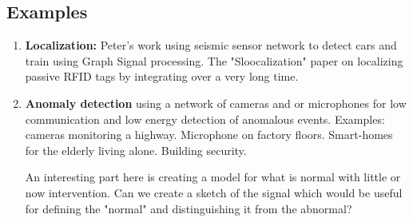 \documentclass{article}
\newcommand{\comment}[3]{{\color{#1} {\bf #2 :} #3}}
\newcommand{\peter}[1]{\comment{purple}{Peter}{#1}}
\begin{document}
\subsection{Examples}
\begin{enumerate}
    \item {\bf Localization:} Peter's work using seismic sensor network to detect cars and train using Graph Signal processing\cite{riahi2017}. The "Sloocalization" paper on localizing passive RFID tags by integrating over a very long time.
    \item {\bf Anomaly detection} using a network of cameras and or microphones for low communication and low energy detection of anomalous events. Examples: cameras monitoring a highway. Microphone on factory floors. Smart-homes for the elderly living alone. Building security.
    
    An interesting part here is creating a model for what is normal with little or now intervention. Can we create a sketch of the signal which would be useful for defining the "normal" and distinguishing it from the abnormal?
\end{enumerate}

\iffalse
\section{Prompts}
These prompts are intended as starting points for sections in the proposal description. The names attached are my wild guess as to whom might interest.

\begin{itemize}
    \item (Piya): Optimizing sensor locations in space. (Rayan/Piya?): Possibly related problem: Unknown (or imperfectly known) sensor locations. {\peter That is array calibration and has been studied much in SP}
    \item (Piya): Suppose we use a sensor array to localize a target. What is the minimal amount of communication between sensors that is needed in order to achieve localization?
    \item (Peter) What are the theoretically minimal resources to perform analysis of seismology / noise. {\bf Peter} I dont think my research focus will be seismology in this proposal. if needed, can do it for proposal. {\bf Yoav} Peter, can you describe some theoretical problems that are interesting for you?
    \item {\peter Focus on the spatio-temporal fields in a  sensor network}
    \item (Rayan, Yoav, Alex): Statistical analysis on sketches. Sub-problems: Anomaly detection. Distribution drift. Creating long-term statistical models (Cars on highway, Factory floor, foot-traffic, engine monitoring){\peter seems interesting}
    \item (Rayan) Learning fast transforms (to reduce computation cost at sensors) 
\end{itemize}
\fi
\end{document}
